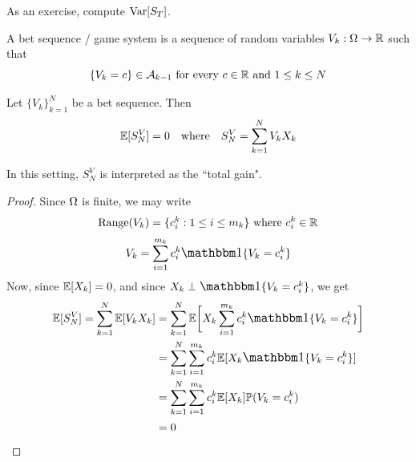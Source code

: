 \documentclass[main]{subfiles}
\begin{document}
As an exercise, compute $ {\mathrm{Var}}[S_T] $.\\

\begin{definition}
    A bet sequence / game system is a sequence of random variables $ V_k:\Omega\to\mathbb R $ such that
    \[\{V_k=c\}\in\mathcal A_{k-1}\text{ for every }c\in\mathbb R\text{ and }1\le k\le N\]
\end{definition}

\begin{theorem}
    Let $ \{V_k\}_{k=1}^N $ be a bet sequence. Then
    \[\mathbb E[S_N^V]=0\text{\quad where\quad}S_N^V=\sum_{k=1}^NV_kX_k\]
\end{theorem}

In this setting, $ S_N^V $ is interpreted as the ``total gain".

\begin{proof}
    Since $ \Omega $ is finite, we may write
    \[\text{Range}(V_k)=\{c_i^k:1\le i\le m_k\}\text{ where }c_i^k\in\mathbb R\]
    \[V_k=\sum_{i=1}^{m_k}c_i^k\one\{V_k=c_i^k\}\]
    Now, since $ \mathbb E[X_k]=0 $, and since $ X_k\perp\mathlarger{\one}\{V_k=c_i^k\} $, we get
    \begin{align*}
        \E[S_N^V]=\sum_{k=1}^N\E[V_kX_k] & =\sum_{k=1}^N\E\bigg[X_k\sum_{i=1}^{m_k}c_i^k\one\{V_k=c_i^k\}\bigg] \\
                                         & = \sum_{k=1}^N\sum_{i=1}^{m_k}c_i^k\E[X_k\one\{V_k=c_i^k\}]          \\
                                         & = \sum_{k=1}^N\sum_{i=1}^{m_k}c_i^k\E[X_k]\P(V_k=c_i^k)              \\
                                         & = 0
    \end{align*}
\end{proof}
\end{document}
